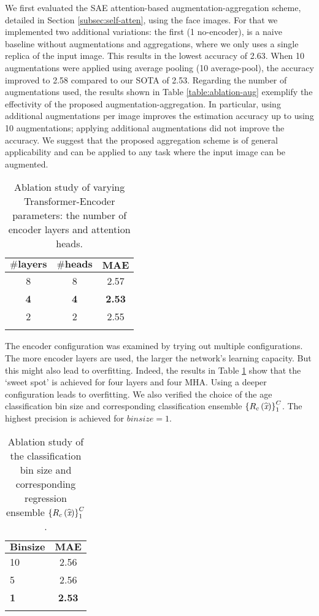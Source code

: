 \documentclass[10pt,journal]{IEEEtran}\usepackage{amsfonts}
\begin{document}
We first evaluated the SAE attention-based augmentation-aggregation scheme,
detailed in Section \ref{subsec:self-atten}, using the face images. For that
we implemented two additional variations: the first (1 no-encoder), is a naive
baseline without augmentations and aggregations, where we only uses a single
replica of the input image. This results in the lowest accuracy of 2.63. When
10 augmentations were applied using average pooling (10 average-pool), the
accuracy improved to 2.58 compared to our SOTA of 2.53. Regarding the number
of augmentations used, the results shown in Table \ref{table:ablation-aug}
exemplify the effectivity of the proposed augmentation-aggregation. In
particular, using additional augmentations per image improves the estimation
accuracy up to using 10 augmentations; applying additional augmentations did
not improve the accuracy. We suggest that the proposed aggregation scheme is
of general applicability and can be applied to any task where the input image
can be augmented.\begin{table}[tbh]
\caption{Ablation study of varying Transformer-Encoder parameters: the number
of encoder layers and attention heads.}\label{tab:encoder_size}
\centering
\strut\vspace*{-\baselineskip}
\begin{tabular}
[c]{@{}ccc}\toprule $\mathbf{\# layers}$ & $\mathbf{\# heads}$ & $\mathbf{MAE}$\\
\midrule 8 & 8 & 2.57\\
\textbf{4} & \textbf{4} & \textbf{2.53}\\
2 & 2 & 2.55\\
\bottomrule &  &
\end{tabular}
\end{table}

The encoder configuration was examined by trying out multiple configurations.
The more encoder layers are used, the larger the network's learning capacity.
But this might also lead to overfitting. Indeed, the results in Table
\ref{tab:encoder_size} show that the `sweet spot' is achieved for four layers
and four MHA. Using a deeper configuration leads to overfitting. We also
verified the choice of the age classification bin size and corresponding
classification ensemble $\left\{  R_{c}\left(  \widehat{\emph{x}}\right)
\right\}  _{1}^{C}$. The highest precision is achieved for $binsize=1$.\begin{table}[tbh]
\caption{Ablation study of the classification bin size and corresponding
regression ensemble $\left\{  R_{c}\left(  \widehat{\emph{x}}\right)
\right\}  _{1}^{C}$.}\label{tab:bin_size}
\centering
\renewcommand{\arraystretch}{1.3}
\begin{tabular}
[c]{@{}lc}\toprule $\mathbf{Bin size}$ & $\mathbf{MAE}$\\
\midrule 10 & 2.56\\
5 & 2.56\\
\textbf{1} & \textbf{2.53}\\
\bottomrule &
\end{tabular}
\end{table}
\end{document}
